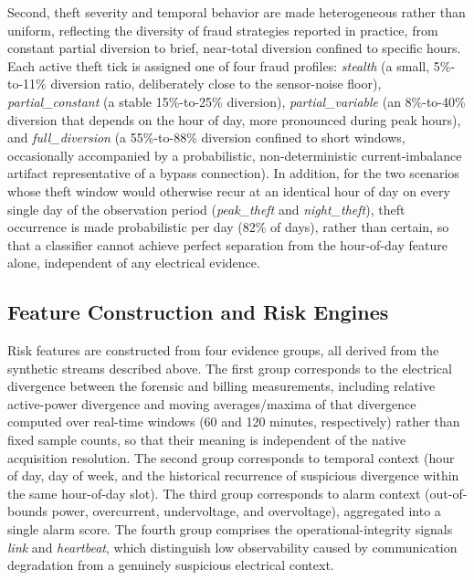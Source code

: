 \documentclass{ieeeaccess}
\begin{document}
Second, theft severity and temporal behavior are made heterogeneous rather than uniform, reflecting the diversity of fraud strategies reported in practice, from constant partial diversion to brief, near-total diversion confined to specific hours. Each active theft tick is assigned one of four fraud profiles: \textit{stealth} (a small, 5\%-to-11\% diversion ratio, deliberately close to the sensor-noise floor), \textit{partial\_constant} (a stable 15\%-to-25\% diversion), \textit{partial\_variable} (an 8\%-to-40\% diversion that depends on the hour of day, more pronounced during peak hours), and \textit{full\_diversion} (a 55\%-to-88\% diversion confined to short windows, occasionally accompanied by a probabilistic, non-deterministic current-imbalance artifact representative of a bypass connection). In addition, for the two scenarios whose theft window would otherwise recur at an identical hour of day on every single day of the observation period (\textit{peak\_theft} and \textit{night\_theft}), theft occurrence is made probabilistic per day (82\% of days), rather than certain, so that a classifier cannot achieve perfect separation from the hour-of-day feature alone, independent of any electrical evidence.

\subsection{Feature Construction and Risk Engines}
Risk features are constructed from four evidence groups, all derived from the synthetic streams described above. The first group corresponds to the electrical divergence between the forensic and billing measurements, including relative active-power divergence and moving averages/maxima of that divergence computed over real-time windows (60 and 120 minutes, respectively) rather than fixed sample counts, so that their meaning is independent of the native acquisition resolution. The second group corresponds to temporal context (hour of day, day of week, and the historical recurrence of suspicious divergence within the same hour-of-day slot). The third group corresponds to alarm context (out-of-bounds power, overcurrent, undervoltage, and overvoltage), aggregated into a single alarm score. The fourth group comprises the operational-integrity signals \textit{link} and \textit{heartbeat}, which distinguish low observability caused by communication degradation from a genuinely suspicious electrical context.
\end{document}
